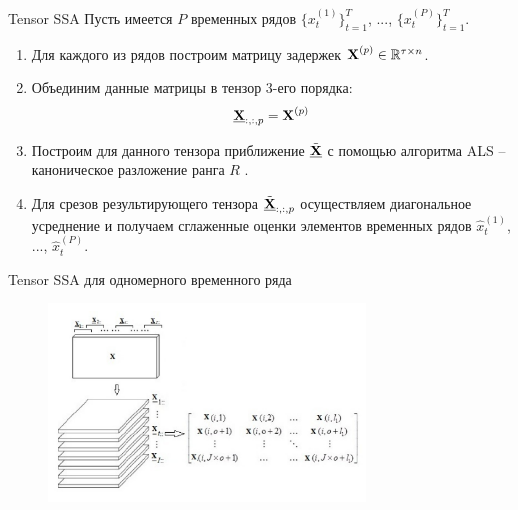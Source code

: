 \begin{frame}{Tensor SSA}
Пусть имеется $P$ временных рядов $\{ x_t^{(1)} \}_{t=1}^T$, ...,  $\{ x_t^{(P)} \}_{t=1}^T$.
\begin{enumerate}
    \item Для каждого из рядов построим матрицу задержек $\textbf{X}^{(p)} \in \mathbb{R}^{\tau \times n}$.
    \item Объединим данные матрицы в тензор 3-его порядка:
    $$ \underline{\textbf{X}}_{:, :, p} = \textbf{X}^{(p)}$$
    \item Построим для данного тензора приближение $\tilde{\underline{\textbf{X}}}$ с помощью алгоритма ALS -- каноническое разложение ранга $R$ .
    \item Для срезов результирующего тензора $\tilde{\underline{\textbf{X}}}_{:, :, p}$ осуществляем диагональное усреднение и получаем сглаженные оценки элементов временных рядов $ \hat{x}_t^{(1)}$, ...,  $\hat{x}_t^{(P)}$.
\end{enumerate}
\end{frame}

\begin{frame}{Tensor SSA для одномерного временного ряда}
\begin{figure}
    \centering
    \includegraphics[width=0.75\textwidth]{lecture_14/figs/tSSA.png}
\end{figure}
\end{frame}

